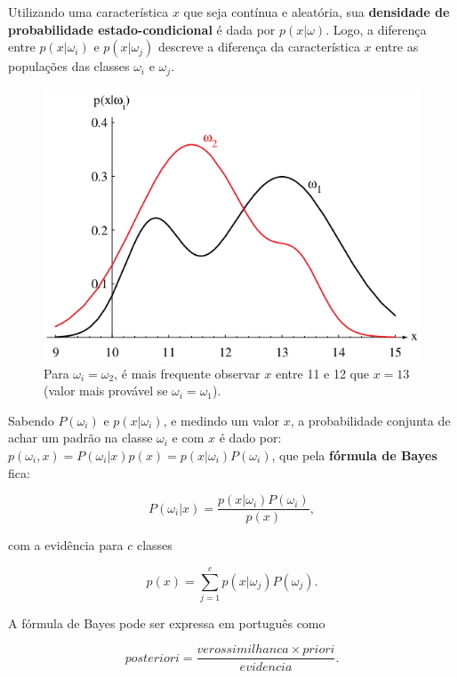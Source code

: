 \documentclass[a4paper,12pt,twocolumn]{article}
\begin{document}
Utilizando uma característica $x$ que seja contínua e aleatória, sua \textbf{densidade de probabilidade estado-condicional} é dada por $p(x|\omega)$. Logo, a diferença entre $p(x|\omega_i)$ e $p(x|\omega_j)$ descreve a diferença da característica $x$ entre as populações das classes $\omega_i$ e $\omega_j$.

\begin{figure}[ht]
    \centering
    \includegraphics[scale=0.4]{state-conditional_pdf}
    \caption{Para $\omega_i = \omega_2$, é mais frequente observar $x$ entre 11 e 12 que $x = 13$ (valor mais provável se $\omega_i = \omega_1$).}
    \label{fig:state-conditional_pdf}
\end{figure}

Sabendo $P(\omega_i)$ e $p(x|\omega_i)$, e medindo um valor $x$, a probabilidade conjunta de achar um padrão na classe $\omega_i$ e com $x$ é dado por: $p(\omega_i,x) = P(\omega_i|x)p(x) = p(x|\omega_i)P(\omega_i)$, que pela \textbf{fórmula de Bayes} fica:

\begin{equation}
    P(\omega_i|x) = \frac{p(x|\omega_i)P(\omega_i)}{p(x)},
    \label{eq:bayes}
\end{equation}

\noindent com a evidência para $c$ classes

\begin{equation}
    p(x) = \sum_{j=1}^c p(x|\omega_j)P(\omega_j).
    \label{eq:bayes}
\end{equation}

A fórmula de Bayes pode ser expressa em português como

\begin{equation}
    posteriori = \frac{verossimilhanca \times priori}{evidencia}.
    \label{eq:bayes}
\end{equation}
\end{document}
